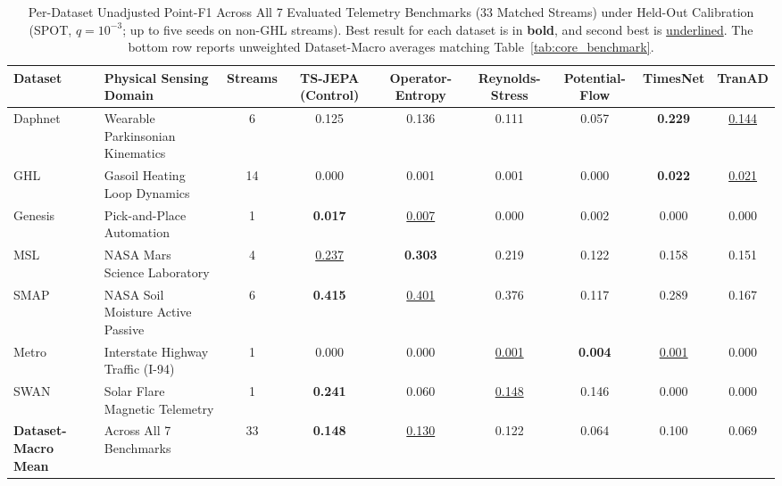 \begin{table}[t]
\centering
\caption{Per-Dataset Unadjusted Point-F1 Across All 7 Evaluated Telemetry Benchmarks (33 Matched Streams) under Held-Out Calibration (SPOT, $q=10^{-3}$; up to five seeds on non-GHL streams). Best result for each dataset is in \textbf{bold}, and second best is \underline{underlined}. The bottom row reports unweighted Dataset-Macro averages matching Table~\ref{tab:core_benchmark}.}
\label{tab:all_datasets}
\small
\scriptsize
\setlength{\tabcolsep}{2.5pt}
\begin{tabular}{@{}ll c cccc cc@{}}
\toprule
\textbf{Dataset} & \textbf{Physical Sensing Domain} & \textbf{Streams} & \textbf{TS-JEPA (Control)} & \textbf{Operator-Entropy} & \textbf{Reynolds-Stress} & \textbf{Potential-Flow} & \textbf{TimesNet} & \textbf{TranAD} \\
\midrule
Daphnet  & Wearable Parkinsonian Kinematics & 6  & 0.125             & 0.136 & 0.111 & 0.057 & \textbf{0.229} & \underline{0.144} \\
GHL      & Gasoil Heating Loop Dynamics     & 14 & 0.000             & 0.001 & 0.001 & 0.000 & \textbf{0.022} & \underline{0.021} \\
Genesis  & Pick-and-Place Automation        & 1  & \textbf{0.017}    & \underline{0.007} & 0.000 & 0.002 & 0.000 & 0.000 \\
MSL      & NASA Mars Science Laboratory     & 4  & \underline{0.237} & \textbf{0.303} & 0.219 & 0.122 & 0.158 & 0.151 \\
SMAP     & NASA Soil Moisture Active Passive & 6  & \textbf{0.415}    & \underline{0.401} & 0.376 & 0.117 & 0.289 & 0.167 \\
Metro    & Interstate Highway Traffic (I-94) & 1  & 0.000             & 0.000 & \underline{0.001} & \textbf{0.004} & \underline{0.001} & 0.000 \\
SWAN     & Solar Flare Magnetic Telemetry   & 1  & \textbf{0.241}    & 0.060 & \underline{0.148} & 0.146 & 0.000 & 0.000 \\
\midrule
\textbf{Dataset-Macro Mean} & Across All 7 Benchmarks & 33 & \textbf{0.148} & \underline{0.130} & 0.122 & 0.064 & 0.100 & 0.069 \\
\bottomrule
\end{tabular}
\end{table}



